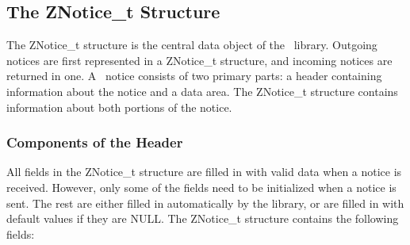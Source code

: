 %
\subsection{The ZNotice_t Structure}
\label{ZNoticet}

The ZNotice_t structure is the central data object of the \Zephyr\
library.  Outgoing notices are first represented in a ZNotice_t
structure, and incoming notices are returned in one.  A \Zephyr\
notice consists of two primary parts: a header containing information
about the notice and a data area.  The ZNotice_t structure contains
information about both portions of the notice.

\subsubsection{Components of the Header}

All fields in the ZNotice_t structure are filled in with valid data
when a notice is received.  However, only some of the fields need to
be initialized when a notice is sent.  The rest are either filled in
automatically by the library, or are filled in with default values if
they are NULL.  The ZNotice_t structure contains the following fields:

